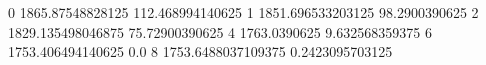 0 1865.87548828125 112.468994140625
1 1851.696533203125 98.2900390625
2 1829.135498046875 75.72900390625
4 1763.0390625 9.632568359375
6 1753.406494140625 0.0
8 1753.6488037109375 0.2423095703125
